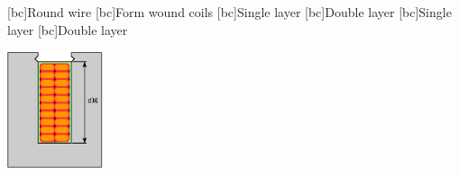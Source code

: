 \begin{psfrags}%
\psfragscanon

[bc]{{\tiny Round wire}}
[bc]{{\tiny Form wound coils}}
[bc]{{\tiny Single layer}}
[bc]{{\tiny Double layer}}
[bc]{{\tiny Single layer}}
[bc]{{\tiny Double layer}}

\includegraphics[width=0.21\textwidth]{figs/f_insulation_c.eps}
\end{psfrags}%